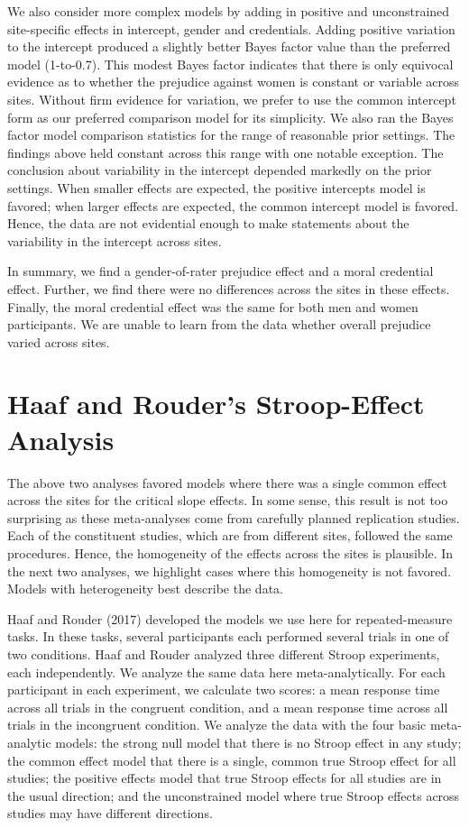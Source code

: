 \documentclass[english,man]{apa6}
\theoremstyle{definition}
\theoremstyle{definition}
\theoremstyle{definition}
\theoremstyle{remark}
\begin{document}
We also consider more complex models by adding in positive and
unconstrained site-specific effects in intercept, gender and
credentials. Adding positive variation to the intercept produced a
slightly better Bayes factor value than the preferred model (1-to-0.7).
This modest Bayes factor indicates that there is only equivocal evidence
as to whether the prejudice against women is constant or variable across
sites. Without firm evidence for variation, we prefer to use the common
intercept form as our preferred comparison model for its simplicity. We
also ran the Bayes factor model comparison statistics for the range of
reasonable prior settings. The findings above held constant across this
range with one notable exception. The conclusion about variability in
the intercept depended markedly on the prior settings. When smaller
effects are expected, the positive intercepts model is favored; when
larger effects are expected, the common intercept model is favored.
Hence, the data are not evidential enough to make statements about the
variability in the intercept across sites.

In summary, we find a gender-of-rater prejudice effect and a moral
credential effect. Further, we find there were no differences across the
sites in these effects. Finally, the moral credential effect was the
same for both men and women participants. We are unable to learn from
the data whether overall prejudice varied across sites.

\section{Haaf and Rouder's Stroop-Effect
Analysis}\label{haaf-and-rouders-stroop-effect-analysis}

The above two analyses favored models where there was a single common
effect across the sites for the critical slope effects. In some sense,
this result is not too surprising as these meta-analyses come from
carefully planned replication studies. Each of the constituent studies,
which are from different sites, followed the same procedures. Hence, the
homogeneity of the effects across the sites is plausible. In the next
two analyses, we highlight cases where this homogeneity is not favored.
Models with heterogeneity best describe the data.

Haaf and Rouder (2017) developed the models we use here for
repeated-measure tasks. In these tasks, several participants each
performed several trials in one of two conditions. Haaf and Rouder
analyzed three different Stroop experiments, each independently. We
analyze the same data here meta-analytically. For each participant in
each experiment, we calculate two scores: a mean response time across
all trials in the congruent condition, and a mean response time across
all trials in the incongruent condition. We analyze the data with the
four basic meta-analytic models: the strong null model that there is no
Stroop effect in any study; the common effect model that there is a
single, common true Stroop effect for all studies; the positive effects
model that true Stroop effects for all studies are in the usual
direction; and the unconstrained model where true Stroop effects across
studies may have different directions.
\end{document}
